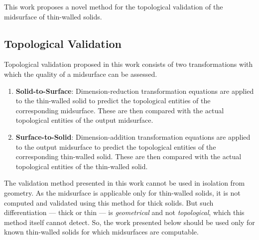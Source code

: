 \documentclass[11pt,a4paper]{article}
\newtheorem{remark}[theorem]{Remark}
\begin{document}
This work proposes a novel method for the topological validation of the
midsurface of thin-walled solids.

\subsection{Topological Validation}

Topological validation proposed in this work consists of two transformations
with which the quality of a midsurface can be assessed.
\begin{enumerate}
\item \textbf{Solid-to-Surface}: Dimension-reduction transformation equations
      are applied to the thin-walled solid to predict the topological entities
      of the corresponding midsurface. These are then compared with the actual
      topological entities of the output midsurface.
\item \textbf{Surface-to-Solid}: Dimension-addition transformation equations
      are applied to the output midsurface to predict the topological entities
      of the corresponding thin-walled solid. These are then compared with the
      actual topological entities of the thin-walled solid.
\end{enumerate}

%
%

The validation method presented in this work cannot be used in isolation from
geometry. As the midsurface is applicable only for thin-walled solids, it is
not computed and validated using this method for thick solids. But such
differentiation --- thick or thin --- is \emph{geometrical} and not
\emph{topological}, which this method itself cannot detect. So, the work
presented below should be used only for known thin-walled solids for which
midsurfaces are computable.
\end{document}
